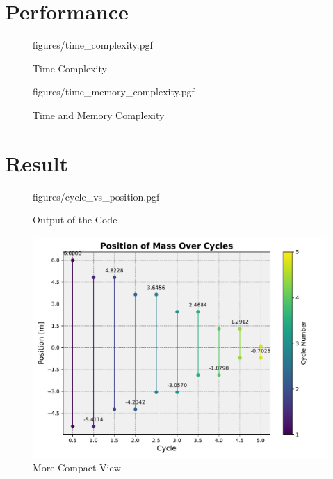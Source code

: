 \documentclass[12pt, a4paper, oneside]{report}
\begin{document}
\vspace*{\fill}\newpage
\section{Performance}

\begin{figure}[ht!]
	\centering
	\begin{adjustbox}{width=\textwidth, center}
		{figures/time_complexity.pgf}
	\end{adjustbox}
	\caption{Time Complexity}
	\label{fig:enter-label}
\end{figure}

\begin{figure}[ht!]
	\centering
	\begin{adjustbox}{width=\textwidth, center}
		{figures/time_memory_complexity.pgf}
	\end{adjustbox}
	\caption{Time and Memory Complexity}
	\label{fig:enter-label}
\end{figure}
\vspace*{\fill}\newpage
\section{Result}

\begin{figure}[ht!]
	\centering
	\begin{adjustbox}{width=0.8\textwidth, center}
		{figures/cycle_vs_position.pgf}
	\end{adjustbox}
	\caption{Output of the Code}
	\label{fig:enter-label}
\end{figure}

\begin{figure}[ht!]
	\centering
	\begin{adjustbox}{width=0.8\textwidth, center}
		\includegraphics{figures/cycle_vs_position.pdf}
	\end{adjustbox}
	\caption{More Compact View}
	\label{fig:displacement_velocity}
\end{figure}
\end{document}
